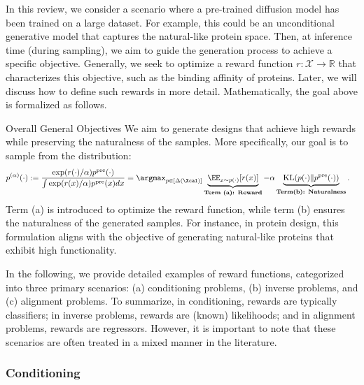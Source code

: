 \documentclass[12pt]{article} %
\begin{document}
{In this review, we consider a scenario where a pre-trained diffusion model has been trained on a large dataset. For example, this could be an unconditional generative model that captures the natural-like protein space. Then, at inference time (during sampling), we aim to guide the generation process to achieve a specific objective. Generally, we seek to optimize a reward function $r: \mathcal{X} \to \mathbb{R}$ that characterizes this objective, such as the binding affinity of proteins. Later, we will discuss how to define such rewards in more detail.  Mathematically, the goal above is formalized as follows. 

\begin{AIbox}{Overall General Objectives}
We aim to generate designs that achieve high rewards while preserving the naturalness of the samples. More specifically, our goal is to sample from the distribution:
\begin{align}
 p^{(\alpha)}(\cdot)& := \frac{\exp(r(\cdot )/\alpha)p^{\pre}(\cdot)}{\int \exp(r(x)/\alpha)p^{\pre}(x)dx}=  \argmax_{p\in [\Delta(\Xcal)] }\underbrace{\EE_{x\sim p(\cdot)}[r(x)]}_{\textbf{Term (a): Reward}}-\alpha \underbrace{\KL( p(\cdot) \| p^{\pre}(\cdot))}_{\textbf{Term(b): Naturalness}}  \label{eq:target_dist}. 
\end{align}
Term (a) is introduced to optimize the reward function, while term (b) ensures the naturalness of the generated samples. For instance, in protein design, this formulation aligns with the objective of generating natural-like proteins that exhibit high functionality. 
\end{AIbox}



{ In the following, we provide detailed examples of reward functions, categorized into three primary scenarios: (a) conditioning problems, (b) inverse problems, and (c) alignment problems. To summarize, in conditioning, rewards are typically classifiers; in inverse problems, rewards are (known) likelihoods; and in alignment problems, rewards are regressors. However, it is important to note that these scenarios are often treated in a mixed manner in the literature.  } 


\subsubsection{Conditioning}\label{sec:conditioning}


}
\end{document}
